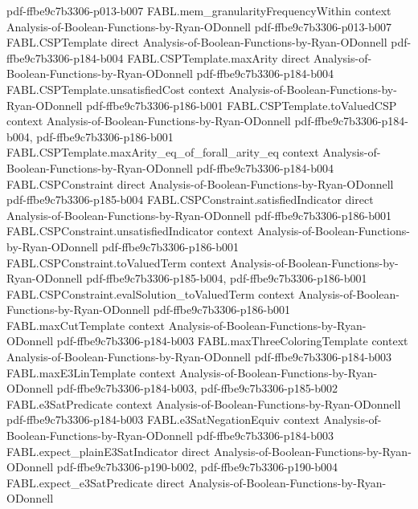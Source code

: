 \begin{theorem}
  {pdf-ffbe9c7b3306-p013-b007}
\proofstep
  {FABL.mem_granularityFrequencyWithin}
  {context}
  {Analysis-of-Boolean-Functions-by-Ryan-ODonnell}
  {pdf-ffbe9c7b3306-p013-b007}
\proofstep
  {FABL.CSPTemplate}
  {direct}
  {Analysis-of-Boolean-Functions-by-Ryan-ODonnell}
  {pdf-ffbe9c7b3306-p184-b004}
\proofstep
  {FABL.CSPTemplate.maxArity}
  {direct}
  {Analysis-of-Boolean-Functions-by-Ryan-ODonnell}
  {pdf-ffbe9c7b3306-p184-b004}
\proofstep
  {FABL.CSPTemplate.unsatisfiedCost}
  {context}
  {Analysis-of-Boolean-Functions-by-Ryan-ODonnell}
  {pdf-ffbe9c7b3306-p186-b001}
\proofstep
  {FABL.CSPTemplate.toValuedCSP}
  {context}
  {Analysis-of-Boolean-Functions-by-Ryan-ODonnell}
  {pdf-ffbe9c7b3306-p184-b004,
    pdf-ffbe9c7b3306-p186-b001}
\proofstep
  {FABL.CSPTemplate.maxArity_eq_of_forall_arity_eq}
  {context}
  {Analysis-of-Boolean-Functions-by-Ryan-ODonnell}
  {pdf-ffbe9c7b3306-p184-b004}
\proofstep
  {FABL.CSPConstraint}
  {direct}
  {Analysis-of-Boolean-Functions-by-Ryan-ODonnell}
  {pdf-ffbe9c7b3306-p185-b004}
\proofstep
  {FABL.CSPConstraint.satisfiedIndicator}
  {direct}
  {Analysis-of-Boolean-Functions-by-Ryan-ODonnell}
  {pdf-ffbe9c7b3306-p186-b001}
\proofstep
  {FABL.CSPConstraint.unsatisfiedIndicator}
  {context}
  {Analysis-of-Boolean-Functions-by-Ryan-ODonnell}
  {pdf-ffbe9c7b3306-p186-b001}
\proofstep
  {FABL.CSPConstraint.toValuedTerm}
  {context}
  {Analysis-of-Boolean-Functions-by-Ryan-ODonnell}
  {pdf-ffbe9c7b3306-p185-b004,
    pdf-ffbe9c7b3306-p186-b001}
\proofstep
  {FABL.CSPConstraint.evalSolution_toValuedTerm}
  {context}
  {Analysis-of-Boolean-Functions-by-Ryan-ODonnell}
  {pdf-ffbe9c7b3306-p186-b001}
\proofstep
  {FABL.maxCutTemplate}
  {context}
  {Analysis-of-Boolean-Functions-by-Ryan-ODonnell}
  {pdf-ffbe9c7b3306-p184-b003}
\proofstep
  {FABL.maxThreeColoringTemplate}
  {context}
  {Analysis-of-Boolean-Functions-by-Ryan-ODonnell}
  {pdf-ffbe9c7b3306-p184-b003}
\proofstep
  {FABL.maxE3LinTemplate}
  {context}
  {Analysis-of-Boolean-Functions-by-Ryan-ODonnell}
  {pdf-ffbe9c7b3306-p184-b003,
    pdf-ffbe9c7b3306-p185-b002}
\proofstep
  {FABL.e3SatPredicate}
  {context}
  {Analysis-of-Boolean-Functions-by-Ryan-ODonnell}
  {pdf-ffbe9c7b3306-p184-b003}
\proofstep
  {FABL.e3SatNegationEquiv}
  {context}
  {Analysis-of-Boolean-Functions-by-Ryan-ODonnell}
  {pdf-ffbe9c7b3306-p184-b003}
\proofstep
  {FABL.expect_plainE3SatIndicator}
  {direct}
  {Analysis-of-Boolean-Functions-by-Ryan-ODonnell}
  {pdf-ffbe9c7b3306-p190-b002,
    pdf-ffbe9c7b3306-p190-b004}
\proofstep
  {FABL.expect_e3SatPredicate}
  {direct}
  {Analysis-of-Boolean-Functions-by-Ryan-ODonnell}

\end{theorem}
